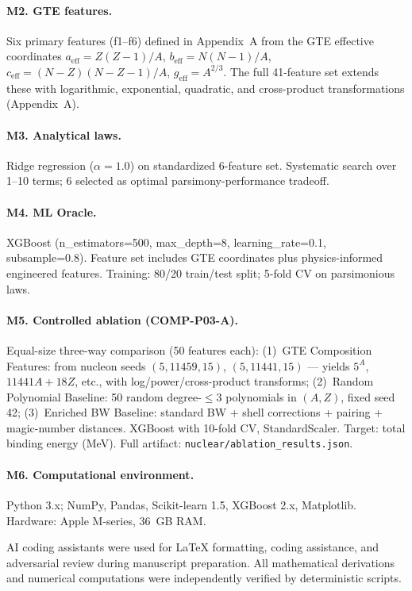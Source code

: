 \documentclass[9pt,twocolumn]{extarticle}
\begin{document}
\paragraph{M2. GTE features.} Six primary features (f1--f6) defined in Appendix~A from the GTE effective coordinates $a_{\mathrm{eff}} = Z(Z-1)/A$, $b_{\mathrm{eff}} = N(N-1)/A$, $c_{\mathrm{eff}} = (N-Z)(N-Z-1)/A$, $g_{\mathrm{eff}} = A^{2/3}$. The full 41-feature set extends these with logarithmic, exponential, quadratic, and cross-product transformations (Appendix~A).

\paragraph{M3. Analytical laws.} Ridge regression ($\alpha=1.0$) on standardized 6-feature set. Systematic search over 1--10 terms; 6 selected as optimal parsimony-performance tradeoff.

\paragraph{M4. ML Oracle.} XGBoost (n\_estimators=500, max\_depth=8, learning\_rate=0.1, subsample=0.8). Feature set includes GTE coordinates plus physics-informed engineered features. Training: 80/20 train/test split; 5-fold CV on parsimonious laws.

\paragraph{M5. Controlled ablation (COMP-P03-A).} Equal-size three-way comparison (50 features each): (1)~GTE Composition Features: from nucleon seeds $(5,11459,15)$, $(5,11441,15)$ — yields $5^A$, $11441A+18Z$, etc., with log/power/cross-product transforms; (2)~Random Polynomial Baseline: 50 random degree-$\leq\!3$ polynomials in $(A,Z)$, fixed seed 42; (3)~Enriched BW Baseline: standard BW + shell corrections + pairing + magic-number distances. XGBoost with 10-fold CV, StandardScaler. Target: total binding energy (MeV). Full artifact: \texttt{nuclear/ablation\_results.json}.

\paragraph{M6. Computational environment.} Python 3.x; NumPy, Pandas, Scikit-learn 1.5, XGBoost 2.x, Matplotlib. Hardware: Apple M-series, 36~GB RAM.

AI coding assistants were used for LaTeX formatting, coding assistance, and adversarial review during manuscript preparation. All mathematical derivations and numerical computations were independently verified by deterministic scripts.
\end{document}

